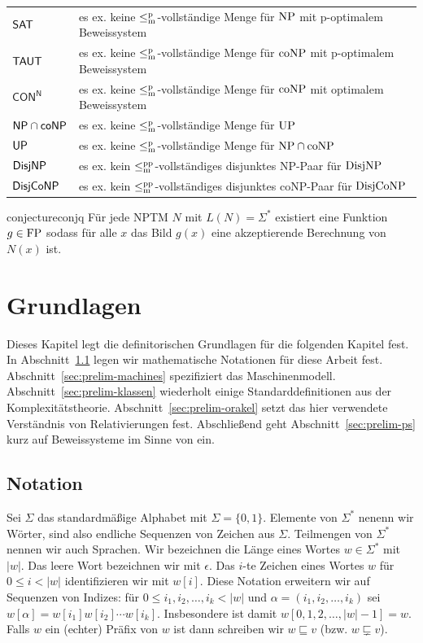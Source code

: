 \bigskip
\begin{tabular}{l@{\quad:\quad}l}
    $\mathsf{SAT}$ & es ex. keine $\leq_\mathrm{m}^\mathrm{p}$-vollständige Menge für $\mathrm{NP}$ mit p-optimalem Beweissystem\\
    $\mathsf{TAUT}$ & es ex. keine $\leq_\mathrm{m}^\mathrm{p}$-vollständige Menge für $\mathrm{coNP}$ mit p-optimalem Beweissystem\\
    $\mathsf{CON^N}$ & es ex. keine $\leq_\mathrm{m}^\mathrm{p}$-vollständige Menge für $\mathrm{coNP}$ mit optimalem Beweissystem\\
    $\mathsf{NP}{}\cap{}\mathsf{coNP}$ & es ex. keine $\leq_\mathrm{m}^\mathrm{p}$-vollständige Menge für $\mathrm{UP}$\\
    $\mathsf{UP}$ & es ex. keine $\leq_\mathrm{m}^\mathrm{p}$-vollständige Menge für $\mathrm{NP}\cap\mathrm{coNP}$\\
    $\mathsf{DisjNP}$ & es ex. kein $\leq_\mathrm{m}^\mathrm{pp}$-vollständiges disjunktes NP-Paar für $\mathrm{DisjNP}$\\
    $\mathsf{DisjCoNP}$ & es ex. kein $\leq_\mathrm{m}^\mathrm{pp}$-vollständiges disjunktes coNP-Paar für $\mathrm{DisjCoNP}$
\end{tabular}
\bigskip

\begin{restatable}{conjecture}{conjq}
    Für jede NPTM $N$ mit $L(N)=\Sigma^*$ existiert eine Funktion $g\in\mathrm{FP}$ sodass für alle $x$ das Bild $g(x)$ eine akzeptierende Berechnung von $N(x)$ ist. 
\end{restatable}

\chapter{Grundlagen}

Dieses Kapitel legt die definitorischen Grundlagen für die folgenden Kapitel fest. In Abschnitt~\ref{sec:notation} legen wir mathematische Notationen für diese Arbeit fest. Abschnitt~\ref{sec:prelim-machines} spezifiziert das Maschinenmodell.  Abschnitt~\ref{sec:prelim-klassen} wiederholt einige Standarddefinitionen aus der Komplexitätstheorie. Abschnitt~\ref{sec:prelim-orakel} setzt das hier verwendete Verständnis von Relativierungen fest. Abschließend geht Abschnitt~\ref{sec:prelim-ps} kurz auf Beweissysteme im Sinne von \textcite{cook_relative_1979} ein.

\section{Notation}\label{sec:notation}

Sei $\Sigma$ das standardmäßige Alphabet mit $\Sigma=\{0,1\}$. Elemente von $\Sigma^*$ nenenn wir Wörter, sind also endliche Sequenzen von Zeichen aus $\Sigma$. Teilmengen von $\Sigma^*$ nennen wir auch Sprachen. Wir bezeichnen die Länge eines Wortes $w\in\Sigma^*$ mit $|w|$. Das leere Wort bezeichnen wir mit $\epsilon$. Das $i$-te Zeichen eines Wortes $w$ für $0\leq i< |w|$ identifizieren wir mit $w[i]$. Diese Notation erweitern wir auf Sequenzen von Indizes: für $0\leq i_1, i_2, \dots, i_k< |w|$ und $\alpha=(i_1, i_2, \dots, i_k)$ sei $w[\alpha] = w[i_1]w[i_2]\cdots w[i_k]$. Insbesondere ist damit $w[0,1,2,\dots, |w|-1]= w$.
Falls $w$ ein (echter) Präfix von $w$ ist dann schreiben wir $w \sqsubseteq v$ (bzw. $w\sqsubsetneq v$).

